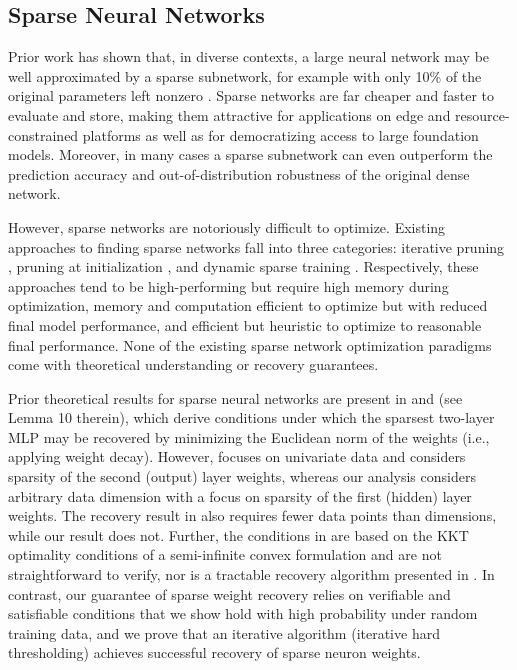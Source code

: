 \documentclass{article} %
\newcommand{\1}{\ensuremath{{\sf (i)}}}
\newcommand{\2}{\ensuremath{{\sf (ii)}}}
\newcommand{\3}{\ensuremath{{\sf (iii)}}}
\newcommand{\4}{\ensuremath{{\sf (iv)}}}
\newcommand{\5}{\ensuremath{{\sf (v)}}}
\newcommand{\6}{\ensuremath{{\sf (vi)}}}
\begin{document}
\subsection{Sparse Neural Networks}
Prior work has shown that, in diverse contexts, a large neural network may be well approximated by a sparse subnetwork, for example with only 10\% of the original parameters left nonzero \citep{frankle2018lottery, nowak2023fantastic}. Sparse networks are far cheaper and faster to evaluate and store, making them attractive for applications on edge and resource-constrained platforms as well as for democratizing access to large foundation models. Moreover, in many cases a sparse subnetwork can even outperform the prediction accuracy \citep{frankle2018lottery} and out-of-distribution robustness \citep{diffenderfer2021winning, wu2024dynamic} of the original dense network. 


However, sparse networks are notoriously difficult to optimize. Existing approaches to finding sparse networks fall into three categories: iterative pruning \citep{frankle2018lottery, liu2024survey}, pruning at initialization \citep{wang2021recent, frankle2021pruning}, and dynamic sparse training \citep{jin2016training, pmlr-v235-ji24a, nowak2023fantastic, damadi2024learning, kusupati2020soft}. Respectively, these approaches tend to be high-performing but require high memory during optimization, memory and computation efficient to optimize but with reduced final model performance, and efficient but heuristic to optimize to reasonable final performance. None of the existing sparse network optimization paradigms come with theoretical understanding or recovery guarantees.

Prior theoretical results for sparse neural networks are present in \citet{boursier2023penalising} and \citet{ergen2021convex} (see Lemma 10 therein), which derive conditions under which the sparsest two-layer MLP may be recovered by minimizing the Euclidean norm of the weights (i.e., applying weight decay). However, \citet{boursier2023penalising} focuses on univariate data and \citet{ergen2021convex} considers sparsity of the second (output) layer weights, whereas our analysis considers arbitrary data dimension with a focus on sparsity of the first (hidden) layer weights. The recovery result in \citet{ergen2021convex} also requires fewer data points than dimensions, while our result does not. Further, the conditions in \citet{ergen2021convex} are based on the KKT optimality conditions of a semi-infinite convex formulation \citep{hettich1993semi} and are not straightforward to verify, nor is a tractable recovery algorithm presented in \citet{ergen2021convex}. In contrast, our guarantee of sparse weight recovery relies on verifiable and satisfiable conditions that we show hold with high probability under random training data, and we prove that an iterative algorithm (iterative hard thresholding) achieves successful recovery of sparse neuron weights.
\end{document}
